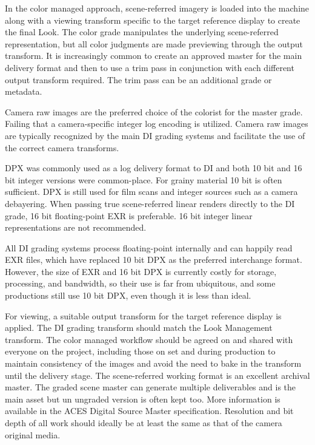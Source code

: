 In the color managed approach, scene-referred imagery is loaded into the machine along with a viewing transform specific to the target reference display to create the final Look. The color grade manipulates the underlying scene-referred representation, but all color judgments are made previewing through the output transform. It is increasingly common to create an approved master for the main delivery format and then to use a trim pass in conjunction with each different output transform required. The trim pass can be an additional grade or metadata.

Camera raw images are the preferred choice of the colorist for the master grade. Failing that a camera-specific integer log encoding is utilized. Camera raw images are typically recognized by the main DI grading systems and facilitate the use of the correct camera transforms.

DPX was commonly used as a log delivery format to DI and both 10 bit and 16 bit integer versions were common-place. For grainy material 10 bit is often sufficient. DPX is still used for film scans and integer sources such as a camera debayering. When passing true scene-referred linear renders directly to the DI grade, 16 bit floating-point EXR is preferable. 16 bit integer linear representations are not recommended.

All DI grading systems process floating-point internally and can happily read EXR files, which have replaced 10 bit DPX as the preferred interchange format. However, the size of EXR and 16 bit DPX is currently costly for storage, processing, and bandwidth, so their use is far from ubiquitous, and some productions still use 10 bit DPX, even though it is less than ideal.

For viewing, a suitable output transform for the target reference display is applied. The DI grading transform should match the Look Management transform. The color managed workflow should be agreed on and shared with everyone on the project, including those on set and during production to maintain consistency of the images and avoid the need to bake in the transform until the delivery stage. The scene-referred working format is an excellent archival master. The graded scene master can generate multiple deliverables and is the main asset but un ungraded version is often kept too. More information is available in the ACES Digital Source Master specification. Resolution and bit depth of all work should ideally be at least the same as that of the camera original media.

